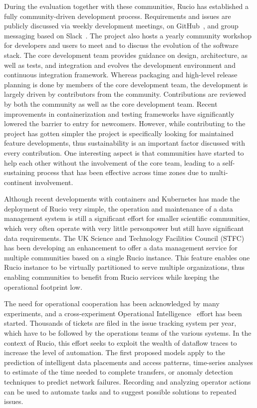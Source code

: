 \documentclass[11pt]{article}
\begin{document}
During the evaluation together with these communities, Rucio has established a fully community-driven development process. Requirements and issues are publicly discussed via weekly development meetings, on GitHub~\cite{ruciogithub}, and group messaging based on Slack~\cite{rucioslack}. The project also hosts a yearly community workshop for developers and users to meet and to discuss the evolution of the software stack. The core development team provides guidance on design, architecture, as well as tests, and integration and evolves the development environment and continuous integration framework. Whereas packaging and high-level release planning is done by members of the core development team, the development is largely driven by contributors from the community. Contributions are reviewed by both the community as well as the core development team. Recent improvements in containerization and testing frameworks have significantly lowered the barrier to entry for newcomers. However, while contributing to the project has gotten simpler the project is specifically looking for maintained feature developments, thus sustainability is an important factor discussed with every contribution. One interesting aspect is that communities have started to help each other without the involvement of the core team, leading to a self-sustaining process that has been effective across time zones due to multi-continent involvement.

Although recent developments with containers and Kubernetes has made the deployment of Rucio very simple, the operation and maintenance of a data management system is still a significant effort for smaller scientific communities, which very often operate with very little personpower but still have significant data requirements. The UK Science and Technology Facilities Council (STFC) has been developing an enhancement to offer a data management service for multiple communities based on a single Rucio instance. This feature enables one Rucio instance to be virtually partitioned to serve multiple organizations, thus enabling communities to benefit from Rucio services while keeping the operational footprint low.

The need for operational cooperation has been acknowledged by many experiments, and a cross-experiment Operational Intelligence~\cite{opint} effort has been started. Thousands of tickets are filed in the issue tracking system per year, which have to be followed by the operations teams of the various systems. In the context of Rucio, this effort seeks to exploit the wealth of dataflow traces to increase the level of automation. The first proposed models apply to the prediction of intelligent data placements and access patterns, time-series analyses to estimate of the time needed to complete transfers, or anomaly detection techniques to predict network failures. Recording and analyzing operator actions can be used to automate tasks and to suggest possible solutions to repeated issues.
\end{document}
